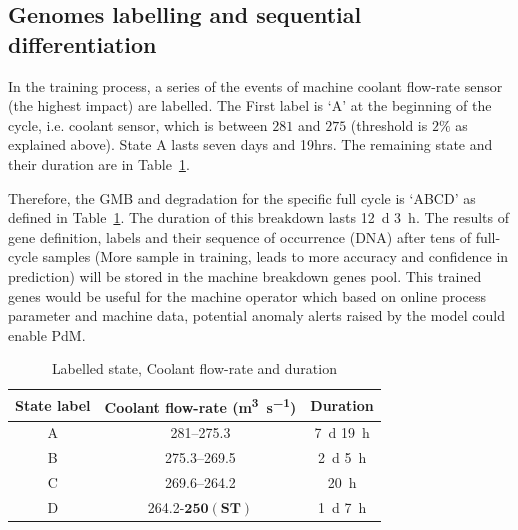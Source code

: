 \documentclass[conference]{IEEEtran}
\begin{document}
\subsection{Genomes labelling and sequential differentiation }
\label{subsec:Genome_labelling}
In the training process, a series of the events of machine coolant flow-rate sensor (the highest impact) are labelled. The First label is ‘A’ at the beginning of the cycle, i.e. coolant sensor, which is between $281$ and $275$ (threshold is $2\%$ as explained above). State A lasts seven days and 19hrs. The remaining state and their duration are in Table~\ref{tab:II}.

Therefore, the GMB and degradation for the specific full cycle is ‘ABCD’ as defined in Table~\ref{tab:II}. The duration of this breakdown lasts \SI{12}{\day} \SI{3}{\hour}. The results of gene definition, labels and their sequence of occurrence (DNA) after tens of full-cycle samples (More sample in training, leads to more accuracy and confidence in prediction) will be stored in the machine breakdown genes pool. This trained genes would be useful for the machine operator which based on online process parameter and machine data, potential anomaly alerts raised by the model could enable PdM.
\begin{table}[htbp]
    \caption{Labelled state, Coolant flow-rate and duration}
    \begin{center}
        \begin{tabular}{|c|c|c|}
            \hline
            \textbf{State label}& \textbf{Coolant flow-rate (\si{\cubic\metre\per\second})}  & \textbf{Duration} \\
            \hline
            A & \numrange[range-phrase = -]{281}{275.3} & \SI{7}{\day} \SI{19}{\hour}  \\
            \hline
            B & \numrange[range-phrase = -]{275.3}{269.5} & \SI{2}{\day} \SI{5}{\hour} \\
            \hline
            C & \numrange[range-phrase = -]{269.6}{264.2} & \SI{20}{\hour} \\
            \hline
            D & \num{264.2}-\underline{$\mathbf{250 (ST)}$} & \SI{1}{\day} \SI{7}{\hour} \\
            \hline
        \end{tabular}
        \label{tab:II}
    \end{center}
\end{table}
\end{document}
